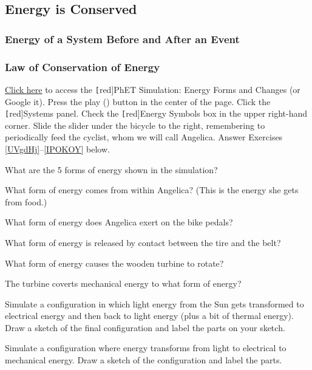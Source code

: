 \documentclass[../main-physics-problems.tex]{subfiles}
\begin{document}
\clearpage

\subsection{Energy is Conserved}

\subsubsection{Energy of a System Before and After an Event}

\subsubsection{Law of Conservation of Energy}

\begin{questions}

\question 
\href{https://phet.colorado.edu/en/simulations/energy-forms-and-changes}{Click here} to access the \texttt[red]{PhET Simulation: Energy Forms and Changes} (or Google it). Press the play ({\tiny \faPlay}) button in the center of the page. Click the \texttt[red]{Systems} panel. Check the \texttt[red]{Energy Symbols} box in the upper right-hand corner. Slide the slider under the bicycle to the right, remembering to periodically feed the cyclist, whom we will call Angelica. Answer Exercises \ref{UVgdHj}--\ref{IPOKOY} below.


\question \label{UVgdHj}
What are the 5 forms of energy shown in the simulation?


\question
What form of energy comes from within Angelica? (This is the energy she gets from food.)


\question
What form of energy does Angelica exert on the bike pedals?


\question
What form of energy is released by contact between the tire and the belt? 


\question
What form of energy causes the wooden turbine to rotate?


\question
The turbine coverts mechanical energy to what form of energy?


\question
Simulate a configuration in which light energy from the Sun gets transformed to electrical energy and then back to light energy (plus a bit of thermal energy). Draw a sketch of the final configuration and label the parts on your sketch.


\question
Simulate a configuration where energy transforms from light to electrical to mechanical energy. Draw a sketch of the configuration and label the parts.



\end{questions}
\end{document}
